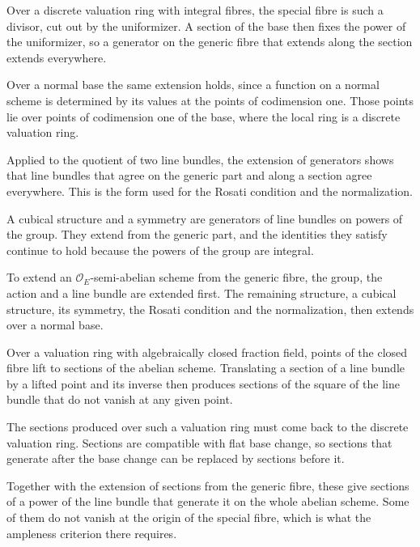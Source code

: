 Over a discrete valuation ring with integral fibres, the special fibre is such a divisor, cut out by the
uniformizer. A section of the base then fixes the power of the uniformizer, so a generator on the generic fibre
that extends along the section extends everywhere.

Over a normal base the same extension holds, since a function on a normal scheme is determined by its values at
the points of codimension one. Those points lie over points of codimension one of the base, where the local ring
is a discrete valuation ring.

Applied to the quotient of two line bundles, the extension of generators shows that line bundles that agree on
the generic part and along a section agree everywhere. This is the form used for the Rosati condition and the
normalization.

A cubical structure and a symmetry are generators of line bundles on powers of the group. They extend from the
generic part, and the identities they satisfy continue to hold because the powers of the group are integral.

To extend an $\mathcal O_E$-semi-abelian scheme from the generic fibre, the group, the action and a line
bundle are extended first. The remaining structure, a cubical structure, its symmetry, the Rosati condition
and the normalization, then extends over a normal base.

Over a valuation ring with algebraically closed fraction field, points of the closed fibre lift to sections of
the abelian scheme. Translating a section of a line bundle by a lifted point and its inverse then produces
sections of the square of the line bundle that do not vanish at any given point.

The sections produced over such a valuation ring must come back to the discrete valuation ring. Sections are
compatible with flat base change, so sections that generate after the base change can be replaced by sections
before it.

Together with the extension of sections from the generic fibre, these give sections of a power of the line
bundle that generate it on the whole abelian scheme. Some of them do not vanish at the origin of the special
fibre, which is what the ampleness criterion there requires.


